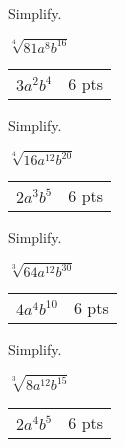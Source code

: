 {
	Simplify.\par
	$\sqrt[4]{81a^{8}b^{16}}$
}
{
	\begin{tabular}{l r}
	$3a^{2}b^{4}$ & 6 pts
	\end{tabular}
}

{
	Simplify.\par
	$\sqrt[4]{16a^{12}b^{20}}$
}
{
	\begin{tabular}{l r}
	$2a^{3}b^{5}$ & 6 pts
	\end{tabular}
}

{
	Simplify.\par
	$\sqrt[3]{64a^{12}b^{30}}$
}
{
	\begin{tabular}{l r}
	$4a^{4}b^{10}$ & 6 pts
	\end{tabular}
}

{
	Simplify.\par
	$\sqrt[3]{8a^{12}b^{15}}$
}
{
	\begin{tabular}{l r}
	$2a^{4}b^{5}$ & 6 pts
	\end{tabular}
}
